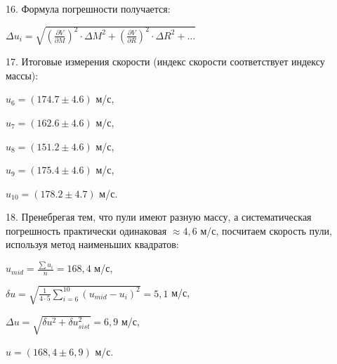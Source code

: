 16. Формула погрешности получается:
\begin{center}

$\Delta u_i = \sqrt{\left(\frac{\partial V}{\partial M}\right)^2\cdot\Delta M^2+\left(\frac{\partial V}{\partial R}\right)^2\cdot\Delta R^2+\dots}$

\end{center}

17. Итоговые измерения скорости (индекс скорости соответствует индексу массы):

\begin{center}
$u_{6} = (174.7 \pm 4.6)$ м/с,

$u_{7} = (162.6 \pm 4.6)$ м/с,

$u_{8} = (151.2 \pm 4.6)$ м/с,

$u_{9} = (175.4 \pm 4.6)$ м/с,

$u_{10} = (178.2 \pm 4.7)$ м/с.
\end{center}

18. Пренебрегая тем, что пули имеют разную массу, а систематическая
погрешность практически одинаковая $\approx 4,6$ м/с, посчитаем
скорость пули, используя метод наименьших квадратов:

\begin{center}

$u_{mid} = \frac{\sum u_i} n = 168,4$ м/с,

$\delta u = \sqrt{\frac{1}{4\cdot5}\sum_{i = 6}^{10}(u_{mid} - u_i)^2} = 5,1$ м/с,

$\Delta u = \sqrt{\delta u^2 + \delta u_{sist}^2} = 6,9$ м/с,

$u = \left(168,4 \pm 6,9\right)$ м/с.
\end{center}
